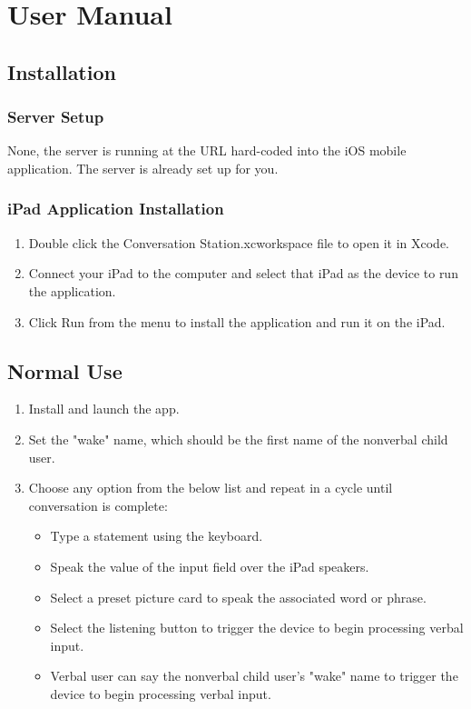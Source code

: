 \chapter{User Manual}
\section{Installation}
\subsection{Server Setup}

None, the server is running at the URL hard-coded into the iOS mobile application. The server is already set up for you.

\subsection{iPad Application Installation}

\begin{enumerate}
\item Double click the Conversation Station.xcworkspace file to open it in Xcode.
\item Connect your iPad to the computer and select that iPad as the device to run the application.
\item Click Run from the menu to install the application and run it on the iPad.
\end{enumerate}

\section{Normal Use}
\begin{enumerate}
\item Install and launch the app.
\item Set the "wake" name, which should be the first name of the nonverbal child user.
\item Choose any option from the below list and repeat in a cycle until conversation is complete:
\begin{itemize}
\item Type a statement using the keyboard.
\item Speak the value of the input field over the iPad speakers.
\item Select a preset picture card to speak the associated word or phrase.
\item Select the listening button to trigger the device to begin processing verbal input.
\item Verbal user can say the nonverbal child user's "wake" name to trigger the device to begin processing verbal input.
\end{itemize}
\end{enumerate}